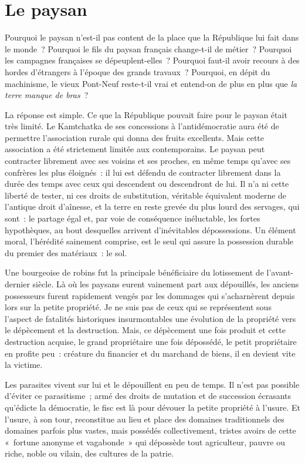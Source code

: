 \documentclass[french,twoside]{book} %
\newcommand{\astermono}{\medskip\centerline{\color{rubric}\large\selectfont{\syms ✻}}\medskip\par}%
\begin{document}
\section[{Le paysan}]{Le paysan}
\noindent Pourquoi le paysan n’est-il pas content de la place que la République lui fait dans le monde ? Pourquoi le fils du paysan français change-t-il de métier ? Pourquoi les campagnes françaises se dépeuplent-elles ? Pourquoi faut-il avoir recours à des hordes d’étrangers à l’époque des grands travaux ? Pourquoi, en dépit du machinisme, le vieux Pont-Neuf reste-t-il vrai et entend-on de plus en plus que \emph{la terre manque de bras} ?\par
La réponse est simple. Ce que la République pouvait faire pour le paysan était très limité. Le Kamtchatka de ses concessions à l’antidémocratie aura été de permettre l’association rurale qui donna des fruits excellents. Mais cette association a été strictement limitée aux contemporains. Le paysan peut contracter librement avec ses voisins et ses proches, en même temps qu’avec ses confrères les plus éloignés : il lui est défendu de contracter librement dans la durée des temps avec ceux qui descendent ou descendront de lui. Il n’a ni cette liberté de tester, ni ces droits de substitution, véritable équivalent moderne de l’antique droit d’aînesse, et la terre en reste grevée du plus lourd des servages, qui sont : le partage égal et, par voie de conséquence inéluctable, les fortes hypothèques, au bout desquelles arrivent d’inévitables dépossessions. Un élément moral, l’hérédité sainement comprise, est le seul qui assure la possession durable du premier des matériaux : le sol.\par

\astermono

\noindent Une bourgeoise de robins fut la principale bénéficiaire du lotissement de l’avant-dernier siècle. Là où les paysans eurent vainement part aux dépouillés, les anciens possesseurs furent rapidement vengés par les dommages qui s’acharnèrent depuis lors sur la petite propriété. Je ne suis pas de ceux qui se représentent sous l’aspect de fatalités historiques insurmontables une évolution de la propriété vers le dépècement et la destruction. Mais, ce dépècement une fois produit et cette destruction acquise, le grand propriétaire une fois dépossédé, le petit propriétaire en profite peu : créature du financier et du marchand de biens, il en devient vite la victime.\par
Les parasites vivent sur lui et le dépouillent en peu de temps. Il n’est pas possible d’éviter ce parasitisme ; armé des droits de mutation et de succession écrasants qu’édicte la démocratie, le fisc est là pour dévouer la petite propriété à l’usure. Et l’usure, à son tour, reconstitue au lieu et place des domaines traditionnels des domaines parfois plus vastes, mais possédés collectivement, tristes avoirs de cette « fortune anonyme et vagabonde » qui dépossède tout agriculteur, pauvre ou riche, noble ou vilain, des cultures de la patrie.\par
\end{document}
